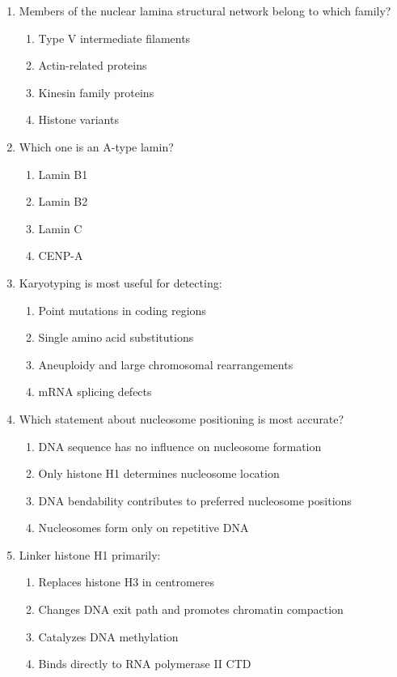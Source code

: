 \documentclass[12pt,fontset=none]{ctexart}
\begin{document}
\begin{enumerate}
\item Members of the nuclear lamina structural network belong to which family?
\begin{enumerate}[label=\alph*.]
\item Type V intermediate filaments
\item Actin-related proteins
\item Kinesin family proteins
\item Histone variants
\end{enumerate}

\item Which one is an A-type lamin?
\begin{enumerate}[label=\alph*.]
\item Lamin B1
\item Lamin B2
\item Lamin C
\item CENP-A
\end{enumerate}

\item Karyotyping is most useful for detecting:
\begin{enumerate}[label=\alph*.]
\item Point mutations in coding regions
\item Single amino acid substitutions
\item Aneuploidy and large chromosomal rearrangements
\item mRNA splicing defects
\end{enumerate}

\item Which statement about nucleosome positioning is most accurate?
\begin{enumerate}[label=\alph*.]
\item DNA sequence has no influence on nucleosome formation
\item Only histone H1 determines nucleosome location
\item DNA bendability contributes to preferred nucleosome positions
\item Nucleosomes form only on repetitive DNA
\end{enumerate}

\item Linker histone H1 primarily:
\begin{enumerate}[label=\alph*.]
\item Replaces histone H3 in centromeres
\item Changes DNA exit path and promotes chromatin compaction
\item Catalyzes DNA methylation
\item Binds directly to RNA polymerase II CTD
\end{enumerate}


\end{enumerate}
\end{document}
